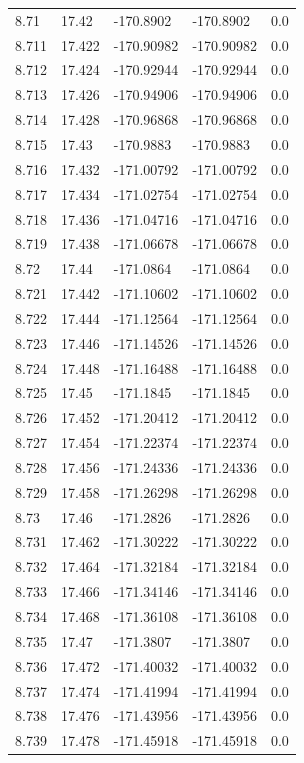\begin{tabular}{lllll}
8.71 & 17.42 & -170.8902 & -170.8902 & 0.0 \\
8.711 & 17.422 & -170.90982 & -170.90982 & 0.0 \\
8.712 & 17.424 & -170.92944 & -170.92944 & 0.0 \\
8.713 & 17.426 & -170.94906 & -170.94906 & 0.0 \\
8.714 & 17.428 & -170.96868 & -170.96868 & 0.0 \\
8.715 & 17.43 & -170.9883 & -170.9883 & 0.0 \\
8.716 & 17.432 & -171.00792 & -171.00792 & 0.0 \\
8.717 & 17.434 & -171.02754 & -171.02754 & 0.0 \\
8.718 & 17.436 & -171.04716 & -171.04716 & 0.0 \\
8.719 & 17.438 & -171.06678 & -171.06678 & 0.0 \\
8.72 & 17.44 & -171.0864 & -171.0864 & 0.0 \\
8.721 & 17.442 & -171.10602 & -171.10602 & 0.0 \\
8.722 & 17.444 & -171.12564 & -171.12564 & 0.0 \\
8.723 & 17.446 & -171.14526 & -171.14526 & 0.0 \\
8.724 & 17.448 & -171.16488 & -171.16488 & 0.0 \\
8.725 & 17.45 & -171.1845 & -171.1845 & 0.0 \\
8.726 & 17.452 & -171.20412 & -171.20412 & 0.0 \\
8.727 & 17.454 & -171.22374 & -171.22374 & 0.0 \\
8.728 & 17.456 & -171.24336 & -171.24336 & 0.0 \\
8.729 & 17.458 & -171.26298 & -171.26298 & 0.0 \\
8.73 & 17.46 & -171.2826 & -171.2826 & 0.0 \\
8.731 & 17.462 & -171.30222 & -171.30222 & 0.0 \\
8.732 & 17.464 & -171.32184 & -171.32184 & 0.0 \\
8.733 & 17.466 & -171.34146 & -171.34146 & 0.0 \\
8.734 & 17.468 & -171.36108 & -171.36108 & 0.0 \\
8.735 & 17.47 & -171.3807 & -171.3807 & 0.0 \\
8.736 & 17.472 & -171.40032 & -171.40032 & 0.0 \\
8.737 & 17.474 & -171.41994 & -171.41994 & 0.0 \\
8.738 & 17.476 & -171.43956 & -171.43956 & 0.0 \\
8.739 & 17.478 & -171.45918 & -171.45918 & 0.0 \\

\end{tabular}
